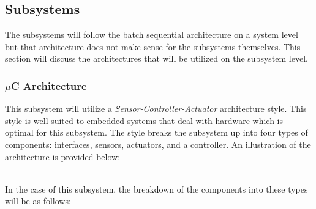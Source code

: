 \documentclass[titlepage]{article}
\begin{document}
\subsection{Subsystems}
The subsystems will follow the batch sequential architecture on a system level but that architecture does not make sense for the subsystems themselves. This section will discuss the architectures that will be utilized on the subsystem level.
\newpage

\subsubsection{$\mu$C Architecture}
This subsystem will utilize a \textit{Sensor-Controller-Actuator} architecture style. This style is well-suited to embedded systems that deal with hardware which is optimal for this subsystem. The style breaks the subsystem up into four types of components: interfaces, sensors, actuators, and a controller. An illustration of the architecture is provided below:\\
\begin{center}
\label{fig:Sensor-Controller-Actuator Architecture}
\end{center}~\\
In the case of this subsystem, the breakdown of the components into these types will be as follows:
\end{document}
